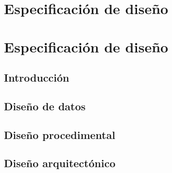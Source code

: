 \chapter{Especificación de diseño} %
\label{cha:Especificación de diseño}

\chapter{Especificación de diseño}

\section{Introducción}

\section{Diseño de datos}

\section{Diseño procedimental}

\section{Diseño arquitectónico}

